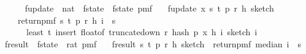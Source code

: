 \begin{isabellebody}
\ \ \ \ {\isacharbraceright}{\kern0pt}{\isachardoublequoteclose}\isanewline
\isanewline
{}\isamarkupfalse%
\ f{}{\isacharunderscore}{\kern0pt}update\ {\isacharcolon}{\kern0pt}{\isacharcolon}{\kern0pt}\ {\isachardoublequoteopen}nat\ {\isasymRightarrow}\ f{}{\isacharunderscore}{\kern0pt}state\ {\isasymRightarrow}\ f{}{\isacharunderscore}{\kern0pt}state\ pmf{\isachardoublequoteclose}\ \isanewline
\ \ {\isachardoublequoteopen}f{}{\isacharunderscore}{\kern0pt}update\ x\ {\isacharparenleft}{\kern0pt}s{\isacharcomma}{\kern0pt}\ t{\isacharcomma}{\kern0pt}\ p{\isacharcomma}{\kern0pt}\ r{\isacharcomma}{\kern0pt}\ h{\isacharcomma}{\kern0pt}\ sketch{\isacharparenright}{\kern0pt}\ {\isacharequal}{\kern0pt}\ \isanewline
\ \ \ \ return{\isacharunderscore}{\kern0pt}pmf\ {\isacharparenleft}{\kern0pt}s{\isacharcomma}{\kern0pt}\ t{\isacharcomma}{\kern0pt}\ p{\isacharcomma}{\kern0pt}\ r{\isacharcomma}{\kern0pt}\ h{\isacharcomma}{\kern0pt}\ {\isasymlambda}i\ {\isasymin}\ {\isacharbraceleft}{\kern0pt}{}{\isachardot}{\kern0pt}{\isachardot}{\kern0pt}{\isacharless}{\kern0pt}s{\isacharbraceright}{\kern0pt}{\isachardot}{\kern0pt}\isanewline
\ \ \ \ \ \ least\ t\ {\isacharparenleft}{\kern0pt}insert\ {\isacharparenleft}{\kern0pt}float{\isacharunderscore}{\kern0pt}of\ {\isacharparenleft}{\kern0pt}truncate{\isacharunderscore}{\kern0pt}down\ r\ {\isacharparenleft}{\kern0pt}hash\ p\ x\ {\isacharparenleft}{\kern0pt}h\ i{\isacharparenright}{\kern0pt}{\isacharparenright}{\kern0pt}{\isacharparenright}{\kern0pt}{\isacharparenright}{\kern0pt}\ {\isacharparenleft}{\kern0pt}sketch\ i{\isacharparenright}{\kern0pt}{\isacharparenright}{\kern0pt}{\isacharparenright}{\kern0pt}{\isachardoublequoteclose}\isanewline
\isanewline
{}\isamarkupfalse%
\ f{}{\isacharunderscore}{\kern0pt}result\ {\isacharcolon}{\kern0pt}{\isacharcolon}{\kern0pt}\ {\isachardoublequoteopen}f{}{\isacharunderscore}{\kern0pt}state\ {\isasymRightarrow}\ rat\ pmf{\isachardoublequoteclose}\ \isanewline
\ \ {\isachardoublequoteopen}f{}{\isacharunderscore}{\kern0pt}result\ {\isacharparenleft}{\kern0pt}s{\isacharcomma}{\kern0pt}\ t{\isacharcomma}{\kern0pt}\ p{\isacharcomma}{\kern0pt}\ r{\isacharcomma}{\kern0pt}\ h{\isacharcomma}{\kern0pt}\ sketch{\isacharparenright}{\kern0pt}\ {\isacharequal}{\kern0pt}\ return{\isacharunderscore}{\kern0pt}pmf\ {\isacharparenleft}{\kern0pt}median\ {\isacharparenleft}{\kern0pt}{\isasymlambda}i\ {\isasymin}\ {\isacharbraceleft}{\kern0pt}{}{\isachardot}{\kern0pt}{\isachardot}{\kern0pt}{\isacharless}{\kern0pt}s{\isacharbraceright}{\kern0pt}{\isachardot}{\kern0pt}\isanewline

\end{isabellebody}
